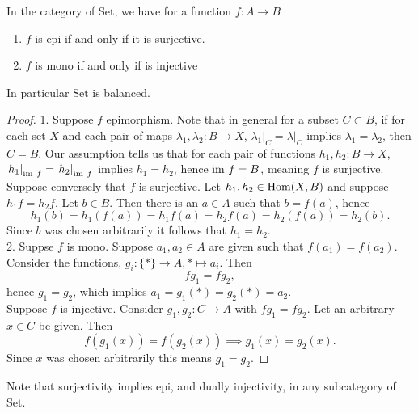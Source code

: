 \begin{lemma}
    In the category of $\mathrm{Set}$, we have for a function $f: A\rightarrow B$
    \begin{enumerate}
        \item $f$ is epi if and only if it is surjective.
        \item $f$ is mono if and only if is injective
    \end{enumerate}
    In particular $\mathrm{Set}$ is balanced. 
\end{lemma}
\begin{proof}
    1. Suppose $f$ epimorphism. Note that in general for a subset $C\subset B$, if for each set $X$ and each pair of maps $\lambda_1,\lambda_2: B\rightarrow X$,  $\left.\lambda_1\right|_{C}=\left.\lambda\right|_C$ implies $\lambda_1 = \lambda_2$, then $C=B$. Our assumption tells us that for each pair of functions $h_1,h_2: B\rightarrow X$, $\left.h_1\right|_{\mathrm{im}\ f} = \left.  h_2\right|_{\mathrm{im}\ f}$ implies $h_1 = h_2$, hence $\mathrm{im} \ f = B$, meaning $f$ is surjective.\\
    Suppose conversely that $f$ is surjective. Let $h_1,h_2\in \mathrm{Hom}(X,B)$ and suppose $h_1 f= h_2 f$. Let $b\in B$. Then there is an $a\in A$ such that $b=f(a)$, hence
    $$h_1(b) = h_1(f(a))=h_1f(a)= h_2f(a)=h_2(f(a))=h_2(b).$$
    Since $b$ was chosen arbitrarily it follows that $h_1=h_2$.\\ 
    2. Suppse $f$ is mono. Suppose $a_1,a_2\in A$ are given such that $f(a_1)=f(a_2)$. Consider the functions, $g_i : \{\ast\} \rightarrow A,\ast\mapsto a_i$. Then 
    $$ 
        fg_1 = fg_2,
    $$
    hence $g_1 = g_2$, which implies $a_1=g_1(\ast)=g_2(\ast)= a_2$.\\
    Suppose $f$ is injective. Consider $g_1,g_2 : C\rightarrow A$ with $fg_1 = fg_2$. Let an arbitrary $x\in C$ be given. Then 
    $$
        f(g_1(x)) = f(g_2(x)) \implies g_1(x) = g_2(x).
    $$ 
    Since $x$ was chosen arbitrarily this means $g_1 = g_2$.    
\end{proof}
\begin{remark}
    Note that surjectivity implies epi, and dually injectivity, in any subcategory of $\mathrm{Set}$. 
\end{remark}
